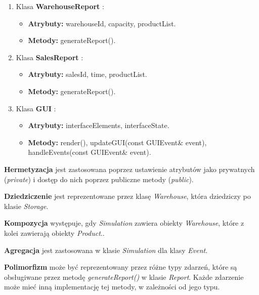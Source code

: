 \documentclass[11pt]{article}
\begin{document}
\begin{enumerate}
    \item Klasa \textbf{WarehouseReport} :
    \begin{itemize}
        \item \textbf{Atrybuty:} warehouseId, capacity, productList.
        \item \textbf{Metody:} generateReport().
    \end{itemize}

    \item Klasa \textbf{SalesReport} :
    \begin{itemize}
        \item \textbf{Atrybuty:} salesId, time, productList.
        \item \textbf{Metody:} generateReport().
    \end{itemize}

\item Klasa \textbf{GUI} :
    \begin{itemize}
        \item \textbf{Atrybuty:} interfaceElements, interfaceState.
        \item \textbf{Metody:} render(), updateGUI(const GUIEvent\& event), handleEvents(const GUIEvent\& event).
    \end{itemize}
    
\end{enumerate}


\textbf{Hermetyzacja} jest zastosowana poprzez ustawienie atrybutów jako prywatnych (\textit{private}) i dostęp do nich poprzez publiczne metody (\textit{public}).
\vspace{1pt}

\textbf{Dziedziczenie} jest reprezentowane przez klasę \textit{Warehouse}, która dziedziczy po klasie \textit{Storage}.
\vspace{1pt}

\textbf{Kompozycja} występuje, gdy \textit{Simulation} zawiera obiekty \textit{Warehouse}, które z kolei zawierają obiekty \textit{Product}..
\vspace{1pt}

\textbf{Agregacja} jest zastosowana w klasie \textit{Simulation} dla klasy \textit{Event}.
\vspace{1pt}

\textbf{Polimorfizm} może być reprezentowany przez różne typy zdarzeń, które są obsługiwane przez metodę \textit{generateReport()} w klasie \textit{Report}. Każde zdarzenie może mieć inną implementację tej metody, w zależności od jego typu.
\end{document}
